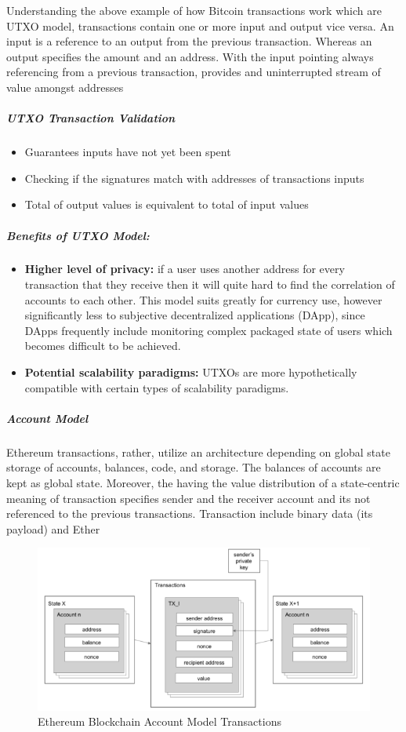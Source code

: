Understanding the above example of how Bitcoin transactions work which are UTXO model, transactions contain one or more input and output vice versa. An input is a reference to an output from the previous transaction. Whereas an output specifies the amount and an address. With the input pointing always referencing from a previous transaction, provides and uninterrupted stream of value amongst addresses

\subparagraph{UTXO Transaction Validation}
\begin{itemize}
\item Guarantees inputs have not yet been spent
\item Checking if the signatures match with addresses of transactions inputs
\item Total of output values is equivalent to total of input values
\end{itemize}


\subparagraph{Benefits of UTXO Model:}
\begin{itemize}
\item \textbf{Higher level of privacy:} if a user uses another address for every transaction that they receive then it will quite hard to find the correlation of accounts to each other. This model suits greatly for currency use, however significantly less to subjective decentralized applications (DApp), since DApps frequently include monitoring complex packaged state of users which becomes difficult to be achieved.
\item \textbf{Potential scalability paradigms:} UTXOs are more hypothetically compatible with certain types of scalability paradigms.
\end{itemize}

\subparagraph{Account Model}

Ethereum transactions, rather, utilize an architecture depending on global state storage of accounts, balances, code, and storage. The balances of accounts are kept as global state. Moreover, the having the value distribution of a state-centric meaning of transaction specifies sender and the receiver account and its not referenced to the previous transactions. Transaction include binary data (its payload) and Ether

\begin{figure}[h]
\centering
\includegraphics[width=1.0\textwidth]{images/account_model.png}
\caption{\label{fig:account model}Ethereum Blockchain Account Model Transactions}
\end{figure}


